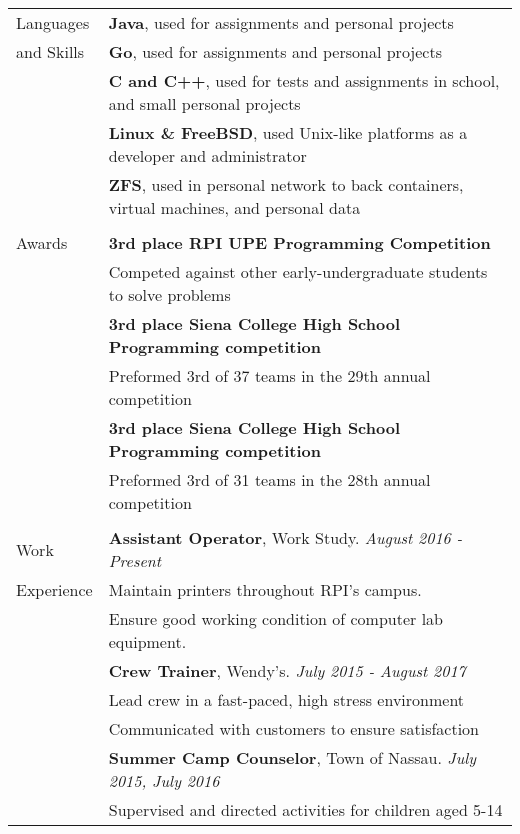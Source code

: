 \documentclass[letterpaper,10pt,oneside]{article}
\begin{document}
\begin{tabular}{@{} l l}
  \Large{Languages}
  & \textbf{Java}, used for assignments and personal projects \\
  \Large{and Skills}
  & \textbf{Go}, used for assignments and personal projects \\
  & \textbf{C and C++}, used for tests and assignments in school, and small personal projects \\
  & \textbf{Linux \& FreeBSD}, used Unix-like platforms as a developer and administrator \\
  & \textbf{ZFS}, used in personal network to back containers, virtual machines, and personal data \\
  & \\

  \Large{Awards}
  & \textbf{3rd place RPI UPE Programming Competition} \\
  & Competed against other early-undergraduate students to solve problems \\
  & \textbf{3rd place Siena College High School Programming competition} \\
  & Preformed 3rd of 37 teams in the 29th annual competition \\
  & \textbf{3rd place Siena College High School Programming competition} \\
  & Preformed 3rd of 31 teams in the 28th annual competition \\
  & \\

  \Large{Work}
  & \textbf{Assistant Operator}, Work Study. \textit{August 2016 - Present} \\
  \Large{Experience}
  & Maintain printers throughout RPI's campus. \\
  & Ensure good working condition of computer lab equipment. \\
  & \textbf{Crew Trainer}, Wendy's. \textit{July 2015 - August 2017} \\
  & Lead crew in a fast-paced, high stress environment \\
  & Communicated with customers to ensure satisfaction \\
  & \textbf{Summer Camp Counselor}, Town of Nassau. \textit{July 2015, July 2016} \\
  & Supervised and directed activities for children aged 5-14 \\

\end{tabular}
\end{document}
